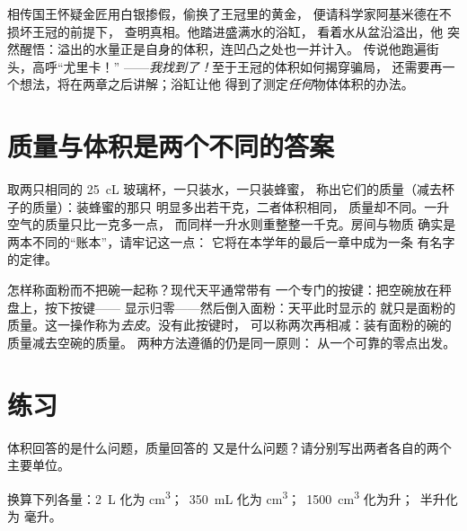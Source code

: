 \begin{example}[浴缸中的王冠]\label{ex:g6:mass-and-volume:archimedes}
相传国王怀疑金匠用白银掺假，偷换了王冠里的黄金，
便请科学家阿基米德在不损坏王冠的前提下，
查明真相。他踏进盛满水的浴缸，
看着水从盆沿溢出，他
突然醒悟：溢出的水量正是自身的体积，连凹凸之处也一并计入。
传说他跑遍街头，高呼“尤里卡！”
——\emph{我找到了！}至于王冠的体积如何揭穿骗局，
还需要再一个想法，将在两章之后讲解；浴缸让他
得到了测定\emph{任何}物体体积的办法。
\end{example}

\section{质量与体积是两个不同的答案}

\begin{example}\label{ex:g6:mass-and-volume:different}
取两只相同的 \qty{25}{cL} 玻璃杯，一只装水，一只装蜂蜜，
称出它们的质量（减去杯子的质量）：装蜂蜜的那只
明显多出若干克，二者体积相同，
质量却不同。一升空气的质量只比一克多一点，
而同样一升水则重整整一千克。房间与物质
确实是两本不同的“账本”，请牢记这一点：
它将在本学年的最后一章中成为一条
有名字的定律。
\end{example}

\begin{remark}[如何单独称出容器中的物料]\label{rem:g6:mass-and-volume:tare}
怎样称面粉而不把碗一起称？现代天平通常带有
一个专门的按键：把空碗放在秤盘上，按下按键——
显示归零——然后倒入面粉：天平此时显示的
就只是面粉的质量。这一操作称为\emph{去皮}。没有此按键时，
可以称两次再相减：装有面粉的碗的质量减去空碗的质量。
两种方法遵循的仍是同一原则：
从一个可靠的零点出发。
\end{remark}

\section{练习}

\begin{exercise}[$\star$]\label{exo:g6:mass-and-volume:1}
体积回答的是什么问题，质量回答的
又是什么问题？请分别写出两者各自的两个主要单位。
\end{exercise}

\begin{exercise}[$\star$]\label{exo:g6:mass-and-volume:2}
换算下列各量：\qty{2}{L} 化为 \unit{cm^3}；\ \qty{350}{mL} 化为
\unit{cm^3}；\ \qty{1500}{cm^3} 化为升；\ 半升化为
毫升。
\end{exercise}

